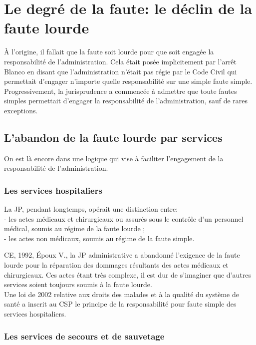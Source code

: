 \documentclass[10pt, a4paper, openany]{book}
\begin{document}
\section{Le degré de la faute: le déclin de la faute lourde}

À l'origine, il fallait que la faute soit lourde pour que soit engagée la responsabilité de l'administration. Cela était posée implicitement par l'arrêt Blanco en disant que l'administration n'était pas régie par le Code Civil qui permettait d'engager n'importe quelle responsabilité sur une simple faute simple. \\
Progressivement, la jurisprudence a commencée à admettre que toute fautes simples permettait d'engager la responsabilité de l'administration, sauf de rares exceptions. 

\subsection{L'abandon de la faute lourde par services}

On est là encore dans une logique qui vise à faciliter l'engagement de la responsabilité de l'administration. 

\subsubsection{Les services hospitaliers}

La JP, pendant longtemps, opérait une distinction entre: \\ 
- les actes médicaux et chirurgicaux ou assurés sous le contrôle d'un personnel médical, soumis au régime de la faute lourde ; \\
- les actes non médicaux, soumis au régime de la faute simple. 


CE, 1992, Époux V., la JP administrative a abandonné l'exigence de la faute lourde pour la réparation des dommages résultants des actes médicaux et chirurgicaux. Ces actes étant très complexe, il est dur de s'imaginer que d'autres services soient toujours soumis à la faute lourde. \\
Une loi de 2002 relative aux droits des malades et à la qualité du système de santé a inscrit au CSP le principe de la responsabilité pour faute simple des services hospitaliers.

\subsubsection{Les services de secours et de sauvetage}
\end{document}
